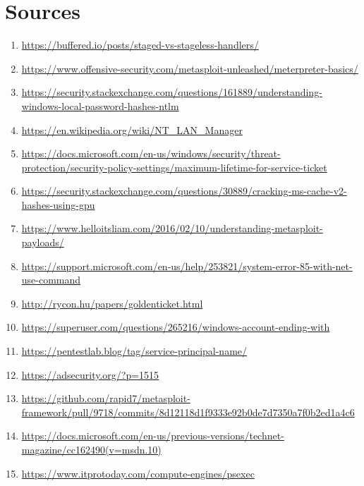 \documentclass{extarticle} %
\begin{document}
    \section{Sources}
    \begin{enumerate}[label=$\bullet$]
        \item \url{https://buffered.io/posts/staged-vs-stageless-handlers/}
        \item \url{https://www.offensive-security.com/metasploit-unleashed/meterpreter-basics/}
        \item \url{https://security.stackexchange.com/questions/161889/understanding-windows-local-password-hashes-ntlm}
        \item \url{https://en.wikipedia.org/wiki/NT_LAN_Manager}
        \item \url{https://docs.microsoft.com/en-us/windows/security/threat-protection/security-policy-settings/maximum-lifetime-for-service-ticket}
        \item \url{https://security.stackexchange.com/questions/30889/cracking-ms-cache-v2-hashes-using-gpu}
        \item \url{https://www.helloitsliam.com/2016/02/10/understanding-metasploit-payloads/}
        \item \url{https://support.microsoft.com/en-us/help/253821/system-error-85-with-net-use-command}
        \item \url{http://rycon.hu/papers/goldenticket.html}
        \item \url{https://superuser.com/questions/265216/windows-account-ending-with}
        \item \url{https://pentestlab.blog/tag/service-principal-name/}
        \item \url{https://adsecurity.org/?p=1515}
        \item \url{https://github.com/rapid7/metasploit-framework/pull/9718/commits/8d12118d1f9333e92b0de7d7350a7f0b2ed1a4c6}
        \item \url{https://docs.microsoft.com/en-us/previous-versions/technet-magazine/cc162490(v=msdn.10)}
        \item \url{https://www.itprotoday.com/compute-engines/psexec}
    \end{enumerate}
\end{document}
